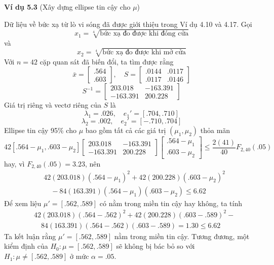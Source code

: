 \vspace{1em}
\noindent\textbf{Ví dụ 5.3} (Xây dựng ellipse tin cậy cho $\mu$)

Dữ liệu về bức xạ từ lò vi sóng đã được giới thiệu trong Ví dụ 4.10 và 4.17. Gọi
\begin{equation*}
x_1 = \sqrt[4]{\text{bức xạ đo được khi đóng cửa}}
\end{equation*}
và
\begin{equation*}
x_2 = \sqrt[4]{\text{bức xạ đo được khi mở cửa}}
\end{equation*}
Với $n = 42$ cặp quan sát đã biến đổi, ta tìm được rằng
\begin{equation*}
\bar{x} = \begin{bmatrix} .564 \\ .603 \end{bmatrix}, \quad
S = \begin{bmatrix}
.0144 & .0117 \\
.0117 & .0146
\end{bmatrix}
\end{equation*}
\begin{equation*}
S^{-1} = \begin{bmatrix}
203.018 & -163.391 \\
-163.391 & 200.228
\end{bmatrix}
\end{equation*}
Giá trị riêng và vectơ riêng của $S$ là
\begin{equation*}
\lambda_1 = .026, \quad e_1' = [.704, .710]
\end{equation*}
\begin{equation*}
\lambda_2 = .002, \quad e_2' = [-.710, .704]
\end{equation*}
Ellipse tin cậy 95\% cho $\mu$ bao gồm tất cả các giá trị $(\mu_1, \mu_2)$ thỏa mãn
\begin{equation*}
42[.564 - \mu_1, .603 - \mu_2] 
\begin{bmatrix}
203.018 & -163.391 \\
-163.391 & 200.228
\end{bmatrix}
\begin{bmatrix}
.564 - \mu_1 \\
.603 - \mu_2
\end{bmatrix}
\le \frac{2(41)}{40} F_{2, 40}(.05)
\end{equation*}
hay, vì $F_{2,40}(.05) = 3.23$, nên
\begin{align*}
&42(203.018)(.564 - \mu_1)^2 + 42(200.228)(.603 - \mu_2)^2 \\
&\quad - 84(163.391)(.564 - \mu_1)(.603 - \mu_2) \le 6.62
\end{align*}
Để xem liệu $\mu' = [.562, .589]$ có nằm trong miền tin cậy hay không, ta tính
\begin{align*}
&42(203.018)(.564 - .562)^2 + 42(200.228)(.603 - .589)^2 - \\
&\quad 84(163.391)(.564 - .562)(.603 - .589) = 1.30 \le 6.62
\end{align*}
Ta kết luận rằng $\mu' = [.562, .589]$ nằm trong miền tin cậy. Tương đương, một kiểm định của $H_0: \mu = [.562, .589]$ sẽ không bị bác bỏ so với $H_1: \mu \neq [.562, .589]$ ở mức $\alpha = .05$.

